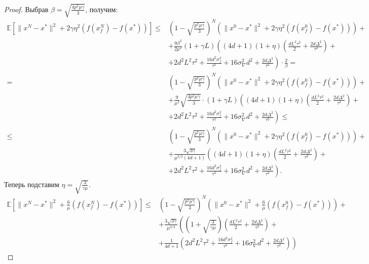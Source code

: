 \documentclass{article}
\begin{document}
\begin{proof}
Выбрав $\beta = \sqrt{\frac{4p^2\mu\gamma}{3}}$, получим:
\begin{align*}
    \mathbb{E}[\|x^N - x^*\|^2 + 2 \gamma \eta^2 (f(x_f^N) - f(x^*))] \leqslant& \left(1 - \sqrt{\frac{p^2\mu\gamma}{3}}\right)^N \left(\|x^0 - x^*\|^2 + 2 \gamma \eta^2 (f(x_f^0) - f(x^*))\right) +\\
    &+ \frac{9\beta^2}{2\mu^2} (1 + \gamma L)\left((4d + 1) (1 + \eta) \left(\frac{d L^2 \tau^2}{2} + \frac{2d\Delta^2}{\tau^2}\right) \right.+\\
    &+\left. 2 d^2 L^2 \tau^2 + \frac{16 d^2 \sigma_f^2}{\tau^2} + 16 \sigma_\nabla^2 d^2 + \frac{2d \Delta^2}{\tau^2}\right) \cdot \frac{2}{\beta}=\\
    =& \left(1 - \sqrt{\frac{p^2\mu\gamma}{3}}\right)^N \left(\|x^0 - x^*\|^2 + 2 \gamma \eta^2 (f(x_f^0) - f(x^*))\right) +\\
    &+ \frac{9}{\mu^2} \sqrt{\frac{4p^2\mu\gamma}{3}} \cdot (1 + \gamma L)\left((4d + 1) (1 + \eta) \left(\frac{d L^2 \tau^2}{2} + \frac{2d\Delta^2}{\tau^2}\right) \right.+\\
    &+\left. 2 d^2 L^2 \tau^2 + \frac{16 d^2 \sigma_f^2}{\tau^2} + 16 \sigma_\nabla^2 d^2 + \frac{2d \Delta^2}{\tau^2}\right) \leqslant\\
    \leqslant& \left(1 - \sqrt{\frac{p^2\mu\gamma}{3}}\right)^N \left(\|x^0 - x^*\|^2 + 2 \gamma \eta^2 (f(x_f^0) - f(x^*))\right) +\\
    &+ \frac{3 \sqrt{3\gamma}}{\mu^{3/2}(4d + 1)} \left((4d + 1) (1 + \eta) \left(\frac{d L^2 \tau^2}{2} + \frac{2d\Delta^2}{\tau^2}\right) \right.+\\
    &+\left. 2 d^2 L^2 \tau^2 + \frac{16 d^2 \sigma_f^2}{\tau^2} + 16 \sigma_\nabla^2 d^2 + \frac{2d \Delta^2}{\tau^2}\right).
\end{align*}
Теперь подставим $\eta = \sqrt{\frac{3}{\gamma\mu}}$.
\begin{align*}
    \mathbb{E}\left[\|x^N - x^*\|^2 + \frac{6}{\mu} (f(x_f^N) - f(x^*))\right] \leqslant& \left(1 - \sqrt{\frac{p^2\mu\gamma}{3}}\right)^N \left(\|x^0 - x^*\|^2 + \frac{6}{\mu} (f(x_f^0) - f(x^*))\right) +\\
    &+ \frac{3 \sqrt{3\gamma}}{\mu^{3/2}} \left(\left(1 + \sqrt{\frac{3}{\gamma\mu}}\right) \left(\frac{d L^2 \tau^2}{2} + \frac{2d\Delta^2}{\tau^2}\right) \right.+\\
    &+\left.\frac{1}{4d + 1}\left(2 d^2 L^2 \tau^2 + \frac{16 d^2 \sigma_f^2}{\tau^2} + 16 \sigma_\nabla^2 d^2 + \frac{2d \Delta^2}{\tau^2}\right)\right)
\end{align*}

\end{proof}
\end{document}
